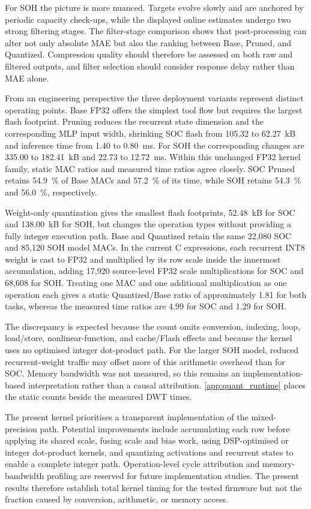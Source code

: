 \documentclass[final,3p,times]{elsarticle}
\newcommand{\code}[1]{\path{#1}}
\begin{document}
For SOH the picture is more nuanced. Targets evolve slowly and are anchored by periodic capacity check-ups, while the displayed online estimates undergo two strong filtering stages. The filter-stage comparison shows that post-processing can alter not only absolute MAE but also the ranking between Base, Pruned, and Quantized. Compression quality should therefore be assessed on both raw and filtered outputs, and filter selection should consider response delay rather than MAE alone.

From an engineering perspective the three deployment variants represent distinct operating points. Base FP32 offers the simplest tool flow but requires the largest flash footprint. Pruning reduces the recurrent state dimension and the corresponding MLP input width, shrinking SOC flash from 105.32 to 62.27~kB and inference time from 1.40 to 0.80~ms. For SOH the corresponding changes are 335.00 to 182.41~kB and 22.73 to 12.72~ms. Within this unchanged FP32 kernel family, static MAC ratios and measured time ratios agree closely. SOC Pruned retains 54.9~\% of Base MACs and 57.2~\% of its time, while SOH retains 54.3~\% and 56.0~\%, respectively.

Weight-only quantization gives the smallest flash footprints, 52.48~kB for SOC and 138.00~kB for SOH, but changes the operation types without providing a fully integer execution path. Base and Quantized retain the same 22,080 SOC and 85,120 SOH model MACs. In the current C expressions, each recurrent INT8 weight is cast to FP32 and multiplied by its row scale inside the innermost accumulation, adding 17,920 source-level FP32 scale multiplications for SOC and 68,608 for SOH. Treating one MAC and one additional multiplication as one operation each gives a static Quantized/Base ratio of approximately 1.81 for both tasks, whereas the measured time ratios are 4.99 for SOC and 1.29 for SOH.

The discrepancy is expected because the count omits conversion, indexing, loop, load/store, nonlinear-function, and cache/Flash effects and because the \code{-O0} kernel uses no optimised integer dot-product path. For the larger SOH model, reduced recurrent-weight traffic may offset more of this arithmetic overhead than for SOC. Memory bandwidth was not measured, so this remains an implementation-based interpretation rather than a causal attribution. \ref{app:quant_runtime} places the static counts beside the measured DWT times.

The present kernel prioritises a transparent implementation of the mixed-precision path. Potential improvements include accumulating each row before applying its shared scale, fusing scale and bias work, using DSP-optimised or integer dot-product kernels, and quantizing activations and recurrent states to enable a complete integer path. Operation-level cycle attribution and memory-bandwidth profiling are reserved for future implementation studies. The present results therefore establish total kernel timing for the tested firmware but not the fraction caused by conversion, arithmetic, or memory access.
\end{document}
